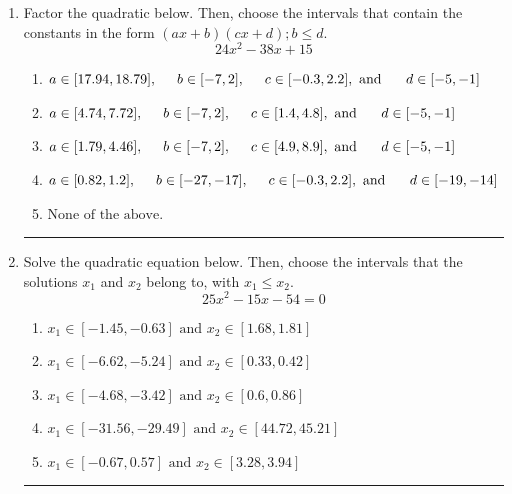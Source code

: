 \documentclass[14pt]{extbook}
\newcommand{\litem}[1]{\item#1\hspace*{-1cm}\rule{\textwidth}{0.4pt}}
\begin{document}
\begin{enumerate}
{\begin{enumerate}[label=\Alph*.]
\end{enumerate} }
\litem{
Factor the quadratic below. Then, choose the intervals that contain the constants in the form $(ax+b)(cx+d); b \leq d.$\[ 24x^{2} -38 x + 15 \]\begin{enumerate}[label=\Alph*.]
\item \( a \in [17.94, 18.79], \hspace*{5mm} b \in [-7, 2], \hspace*{5mm} c \in [-0.3, 2.2], \text{ and } \hspace*{5mm} d \in [-5, -1] \)
\item \( a \in [4.74, 7.72], \hspace*{5mm} b \in [-7, 2], \hspace*{5mm} c \in [1.4, 4.8], \text{ and } \hspace*{5mm} d \in [-5, -1] \)
\item \( a \in [1.79, 4.46], \hspace*{5mm} b \in [-7, 2], \hspace*{5mm} c \in [4.9, 8.9], \text{ and } \hspace*{5mm} d \in [-5, -1] \)
\item \( a \in [0.82, 1.2], \hspace*{5mm} b \in [-27, -17], \hspace*{5mm} c \in [-0.3, 2.2], \text{ and } \hspace*{5mm} d \in [-19, -14] \)
\item \( \text{None of the above.} \)

\end{enumerate} }
\litem{
Solve the quadratic equation below. Then, choose the intervals that the solutions $x_1$ and $x_2$ belong to, with $x_1 \leq x_2$.\[ 25x^{2} -15 x -54 = 0 \]\begin{enumerate}[label=\Alph*.]
\item \( x_1 \in [-1.45, -0.63] \text{ and } x_2 \in [1.68, 1.81] \)
\item \( x_1 \in [-6.62, -5.24] \text{ and } x_2 \in [0.33, 0.42] \)
\item \( x_1 \in [-4.68, -3.42] \text{ and } x_2 \in [0.6, 0.86] \)
\item \( x_1 \in [-31.56, -29.49] \text{ and } x_2 \in [44.72, 45.21] \)
\item \( x_1 \in [-0.67, 0.57] \text{ and } x_2 \in [3.28, 3.94] \)


\end{enumerate}}
\end{enumerate}
\end{document}
